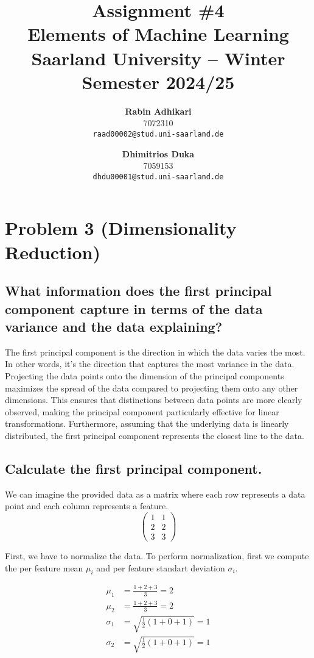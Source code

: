 \documentclass{article}
\title{Assignment \#4\\
  \vspace{2mm}
  \small{Elements of Machine Learning}
  \\
  \vspace{2mm}
  \small{Saarland University -- Winter Semester 2024/25}
}
\author{%
\textbf{Rabin Adhikari} \\
  7072310 \\
  \texttt{raad00002@stud.uni-saarland.de} \\
  \and
  \textbf{Dhimitrios Duka} \\
 7059153 \\
  \texttt{dhdu00001@stud.uni-saarland.de} \\
}
\begin{document}
\maketitle


\setcounter{section}{2}
\section{Problem 3 (Dimensionality Reduction)}
\subsection{What information does the first principal component capture in terms of the data variance and the
data explaining?}
The first principal component is the direction in which the data varies the most. In other words, it's the direction that captures the most variance in the data. Projecting the data points onto the dimension of the principal components maximizes the spread of the data compared to projecting them onto any other dimensions. This ensures that distinctions between data points are more clearly observed, making the principal component particularly effective for linear transformations. Furthermore, assuming that the underlying data is linearly distributed, the first principal component represents the closest line to the data.

\subsection{Calculate the first principal component.}
We can imagine the provided data as a matrix where each row represents a data point and each column represents a feature.
\[
    \begin{pmatrix}
        1 & 1 \\
        2 & 2 \\
        3 & 3
    \end{pmatrix}
\]

First, we have to normalize the data. To perform normalization, first we compute the per feature mean $\mu_i$ and per feature standart deviation $\sigma_i$.

\begin{equation}
    \begin{aligned}
        \mu_1 &= \frac{1 + 2 + 3}{3} = 2 \\
        \mu_2 &= \frac{1 + 2 + 3}{3} = 2 \\
        \sigma_1 &= \sqrt{\frac{1}{2} (1 + 0 + 1)} = 1 \\
        \sigma_2 &= \sqrt{\frac{1}{2} (1 + 0 + 1)} = 1
    \end{aligned}
\end{equation}
\end{document}
